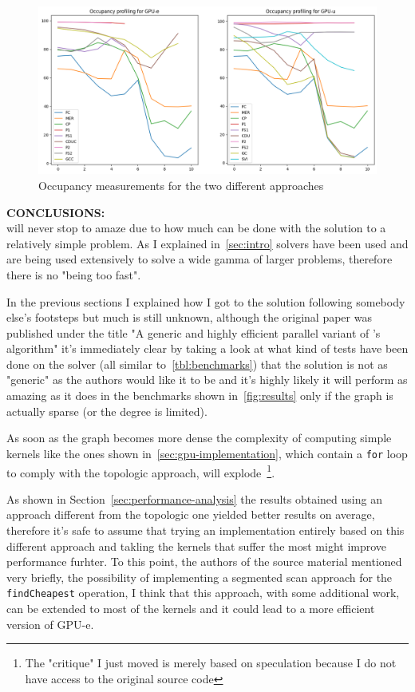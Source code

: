 \documentclass[a4paper,10pt]{article}
\begin{document}
\begin{figure}[!h]
	\centering
	\includegraphics[scale=0.5]{fig/occupancy.png}
	\caption{Occupancy measurements for the two different approaches}
	\label{fig:occupancy}
\end{figure}

\bigskip
{}
\makeatletter{}\makeatother\label{sec:final-thoughts}
\noindent
\textbf{CONCLUSIONS:}
\\
\mstp will never stop to amaze due to how much can be done with the solution to a relatively simple problem. As I explained in~\ref{sec:intro} \mstp solvers have been used and are being used extensively to solve a wide gamma of larger problems, therefore there is no "being too fast".

In the previous sections I explained how I got to the solution following somebody else's footsteps but much is still unknown, although the original paper was published under the title "A generic and highly efficient parallel variant of \brka's algorithm" it's immediately clear by taking a look at what kind of tests have been done on the solver (all similar to~\ref{tbl:benchmarks}) that the solution is not as "generic" as the authors would like it to be and it's highly likely it will perform as amazing as it does in the benchmarks shown in~\ref{fig:results} only if the graph is actually sparse (or the degree is limited).

As soon as the graph becomes more dense the complexity of computing simple kernels like the ones shown in~\ref{sec:gpu-implementation}, which contain a \texttt{for} loop to comply with the topologic approach, will explode~\footnote{The "critique" I just moved is merely based on speculation because I do not have access to the original source code}.

As shown in Section~\ref{sec:performance-analysis} the results obtained using an approach different from the topologic one yielded better results on average, therefore it's safe to assume that trying an implementation entirely based on this different approach and takling the kernels that suffer the most might improve performance furhter. To this point, the authors of the source material mentioned very briefly, the possibility of implementing a segmented scan approach for the \texttt{findCheapest} operation, I think that this approach, with some additional work, can be extended to most of the kernels and it could lead to a more efficient version of GPU-e.
\end{document}
